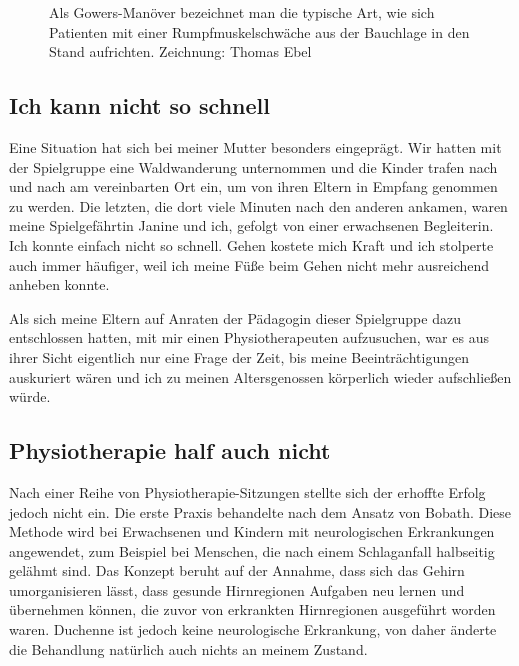 \documentclass[fontsize=14pt,a4paper,headinclude,DIV=calc,automark]{scrbook}
\begin{document}
\setlength{\fboxsep}{0pt}    %
\setlength{\fboxrule}{0.2pt} %
\begin{figure}[ht]
    \centering
    \caption{Als Gowers-Manöver bezeichnet man die typische Art, wie sich Patienten mit einer Rumpfmuskelschwäche aus der Bauchlage in den Stand aufrichten. \hfill Zeichnung: Thomas Ebel}
    \label{fig:gowers-manöver}
\end{figure}

\subsection{Ich kann nicht so schnell}

Eine Situation hat sich bei meiner Mutter besonders eingeprägt. Wir hatten mit der Spielgruppe eine Waldwanderung unternommen und die Kinder trafen nach und nach am vereinbarten Ort ein, um von ihren Eltern in Empfang genommen zu werden. Die letzten, die dort viele Minuten nach den anderen ankamen, waren meine Spielgefährtin Janine und ich, gefolgt von einer erwachsenen Begleiterin. Ich konnte einfach nicht so schnell. Gehen kostete mich Kraft und ich stolperte auch immer häufiger, weil ich meine Füße beim Gehen nicht mehr ausreichend anheben konnte.

Als sich meine Eltern auf Anraten der Pädagogin dieser Spielgruppe dazu entschlossen hatten, mit mir einen Physiotherapeuten aufzusuchen, war es aus ihrer Sicht eigentlich nur eine Frage der Zeit, bis meine Beeinträchtigungen auskuriert wären und ich zu meinen Altersgenossen körperlich wieder aufschließen würde.

\subsection{Physiotherapie half auch nicht}

Nach einer Reihe von Physiotherapie-Sitzungen stellte sich der erhoffte Erfolg jedoch nicht ein. Die erste Praxis behandelte nach dem Ansatz von Bobath. Diese Methode wird bei Erwachsenen und Kindern mit neurologischen Erkrankungen angewendet, zum Beispiel bei Menschen, die nach einem Schlaganfall halbseitig gelähmt sind. Das Konzept beruht auf der Annahme, dass sich das Gehirn umorganisieren lässt, dass gesunde Hirnregionen Aufgaben neu lernen und übernehmen können, die zuvor von erkrankten Hirnregionen ausgeführt worden waren. Duchenne ist jedoch keine neurologische Erkrankung, von daher änderte die Behandlung natürlich auch nichts an meinem Zustand.
\end{document}
